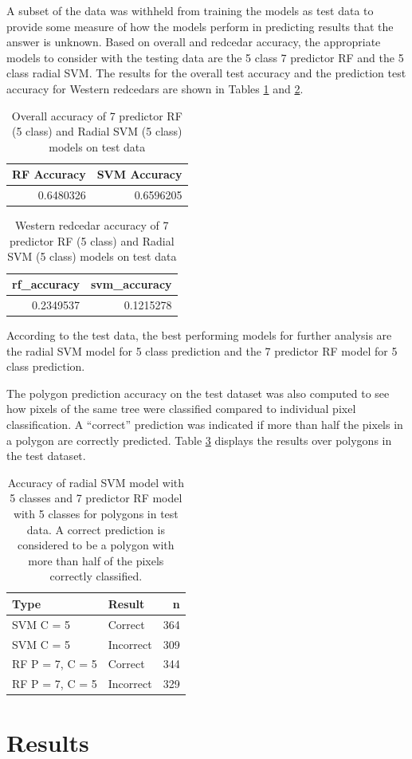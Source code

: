 \documentclass[12pt,twoside]{reedthesis}
\begin{document}
A subset of the data was withheld from training the models as test data to provide some measure of how the models perform in predicting results that the answer is unknown. Based on overall and redcedar accuracy, the appropriate models to consider with the testing data are the 5 class 7 predictor RF and the 5 class radial SVM. The results for the overall test accuracy and the prediction test accuracy for Western redcedars are shown in Tables \ref{tab:resultsTest} and \ref{tab:resultsTest2}.
\begin{table}

\caption{\label{tab:resultsTest}Overall accuracy of 7 predictor RF (5 class) and Radial SVM (5 class) models on test data}
\centering
\begin{tabular}[t]{r|r}
\hline
RF Accuracy & SVM Accuracy\\
\hline
0.6480326 & 0.6596205\\
\hline
\end{tabular}
\end{table}
\begin{table}

\caption{\label{tab:resultsTest2}Western redcedar accuracy of 7 predictor RF (5 class) and Radial SVM (5 class) models on test data}
\centering
\begin{tabular}[t]{r|r}
\hline
rf\_accuracy & svm\_accuracy\\
\hline
0.2349537 & 0.1215278\\
\hline
\end{tabular}
\end{table}
According to the test data, the best performing models for further analysis are the radial SVM model for 5 class prediction and the 7 predictor RF model for 5 class prediction.

The polygon prediction accuracy on the test dataset was also computed to see how pixels of the same tree were classified compared to individual pixel classification. A ``correct'' prediction was indicated if more than half the pixels in a polygon are correctly predicted. Table \ref{tab:polyTab} displays the results over polygons in the test dataset.
\begin{table}

\caption{\label{tab:polyTab}Accuracy of radial SVM model with 5 classes and 7 predictor RF model with 5 classes for polygons in test data. A correct prediction is considered to be a polygon with more than half of the pixels correctly classified.}
\centering
\begin{tabular}[t]{l|l|r}
\hline
Type & Result & n\\
\hline
SVM C = 5 & Correct & 364\\
\hline
SVM C = 5 & Incorrect & 309\\
\hline
RF P = 7, C = 5 & Correct & 344\\
\hline
RF P = 7, C = 5 & Incorrect & 329\\
\hline
\end{tabular}
\end{table}
\hypertarget{results}{%
\chapter{Results}\label{results}}
\end{document}
